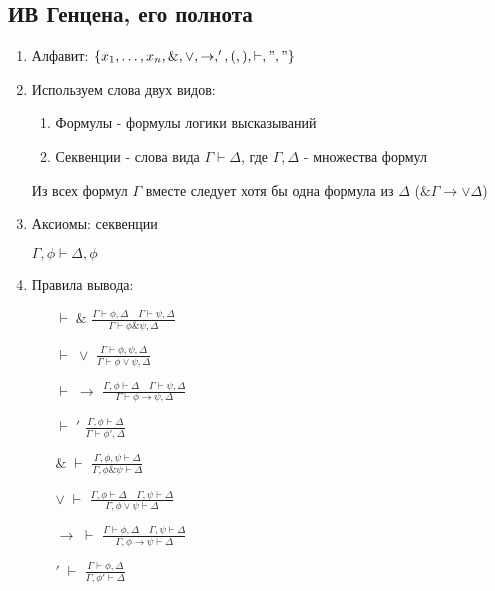 \documentclass[a4paper]{article}
\theoremstyle{definition}
\theoremstyle{remark}
\begin{document}
    \subsection{ИВ Генцена, его полнота}
    \begin{enumerate}
        \item Алфавит: $\{ x_1,\dots, x_n, \&, \vee, \to, ', (, ), \vdash, "," \} $
        \item Используем слова двух видов:
            \begin{enumerate}
                \item Формулы - формулы логики высказываний
                \item Секвенции - слова вида $\Gamma\vdash \Delta$, где $\Gamma, \Delta$ - множества формул
            \end{enumerate}
            Из всех формул $\Gamma$ вместе следует хотя бы одна формула из $\Delta$ ($\&\Gamma \to \vee\Delta$)
        \item Аксиомы: секвенции
        
        $\Gamma, \phi \vdash \Delta, \phi$
        \item Правила вывода:
        \begin{itemize}
            \item[$\vdash\;\&$] $\frac{\Gamma \vdash \phi, \Delta \quad \Gamma \vdash \psi, \Delta}{\Gamma \vdash \phi\&\psi, \Delta}$
            \item[$\vdash\;\vee$] $\frac{\Gamma \vdash \phi, \psi, \Delta}{\Gamma \vdash \phi\vee\psi, \Delta}$
            \item[$\vdash\;\to$] $\frac{\Gamma , \phi \vdash  \Delta \quad \Gamma \vdash \psi, \Delta}{\Gamma \vdash \phi\to\psi, \Delta}$
            \item[$\vdash\;'$] $\frac{\Gamma, \phi\vdash\Delta}{\Gamma \vdash \phi', \Delta}$
            \item[$\&\;\vdash$] $\frac{\Gamma, \phi, \psi \vdash\Delta}{\Gamma, \phi\&\psi \vdash\Delta}$
            \item[$\vee\;\vdash$] $\frac{\Gamma , \phi \vdash  \Delta \quad \Gamma, \psi \vdash  \Delta}{\Gamma,\phi\vee\psi \vdash  \Delta}$
            \item[$\to\;\vdash$] $\frac{\Gamma \vdash\phi ,  \Delta \quad \Gamma, \psi \vdash  \Delta}{\Gamma,\phi\to\psi \vdash  \Delta}$
            \item[$'\;\vdash$] $\frac{\Gamma \vdash\phi ,  \Delta }{\Gamma,\phi' \vdash  \Delta}$
        \end{itemize}
    \end{enumerate}
\end{document}
